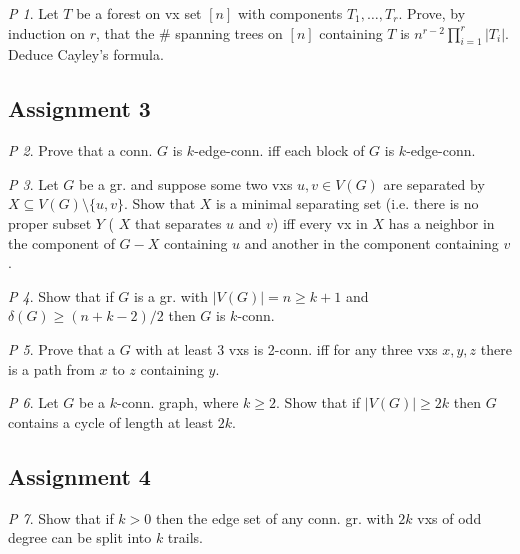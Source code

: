 \documentclass[11pt, fleqn, a4paper, landscape]{article}
\theoremstyle{plain} %
\theoremstyle{remark} %
\newtheorem{problem}{P}
\theoremstyle{definition} %
\begin{document}
\begin{multicols}{5}
\begin{problem}
Let $T$ be a forest on vx set $[n]$ with components $T_1,\dots,T_r$. Prove, by induction on $r$, that the \# spanning trees on $[n]$ containing $T$ is $n^{r-2}\prod_{i=1}^{r}|T_i|$. Deduce Cayley's formula.
\end{problem}

\subsection{Assignment 3}

\begin{problem}
Prove that a conn. $G$ is $k$-edge-conn. iff each block of $G$ is $k$-edge-conn.
\end{problem}

\begin{problem}
Let $G$ be a gr. and suppose some two vxs $u, v \in V (G)$ are separated by $X \subseteq V (G)\setminus\{u,v\}$. Show that $X$ is a minimal separating set (i.e. there is no proper subset $Y$ ( $X$ that separates $u$ and $v$) iff every vx in $X$ has a neighbor in the component
of $G-X$ containing $u$ and another in the component containing $v$.
\end{problem}

\begin{problem}
Show that if $G$ is a gr. with $|V (G)| = n \ge k + 1$ and $\delta(G) \ge(n + k-2)/2$ then $G$ is $k$-conn.
\end{problem}

\begin{problem}
Prove that a $G$ with at least 3 vxs is 2-conn. iff for any three vxs $x, y, z$ there is a path from $x$ to $z$ containing $y$.
\end{problem}

\begin{problem}
Let $G$ be a $k$-conn. graph, where $k \ge 2$. Show that if $|V (G)| \ge 2k$ then $G$ contains a cycle of length at least $2k$.
\end{problem}

\subsection{Assignment 4}

\begin{problem}
Show that if $k > 0$ then the edge set of any conn. gr. with $2k$ vxs of odd degree can be split into $k$ trails.
\end{problem}


\end{multicols}
\end{document}
